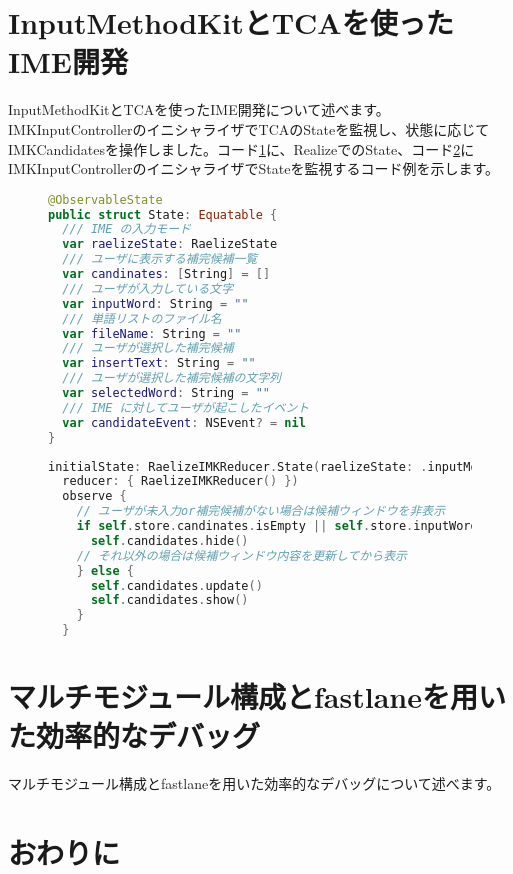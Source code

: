 \documentclass[uplatex,a4j,12pt,twocolumn]{jsarticle}
\begin{document}
\section{InputMethodKitとTCAを使ったIME開発}\label{sec:use_imk_and_tca}
InputMethodKitとTCAを使ったIME開発について述べます。IMKInputControllerのイニシャライザでTCAのStateを監視し、状態に応じてIMKCandidatesを操作しました。コード\ref{listings:state}に、RealizeでのState、コード\ref{listings:initial_state}にIMKInputControllerのイニシャライザでStateを監視するコード例を示します。

\begin{figure}[H]\label{listings:state}
\centering %
\begin{lstlisting}[caption=RealizeでのState例,language=swift]
@ObservableState
public struct State: Equatable {
  /// IME の入力モード
  var raelizeState: RaelizeState
  /// ユーザに表示する補完候補一覧
  var candinates: [String] = []
  /// ユーザが入力している文字
  var inputWord: String = ""
  /// 単語リストのファイル名
  var fileName: String = ""
  /// ユーザが選択した補完候補
  var insertText: String = ""
  /// ユーザが選択した補完候補の文字列
  var selectedWord: String = ""
  /// IME に対してユーザが起こしたイベント
  var candidateEvent: NSEvent? = nil
}
\end{lstlisting}
\end{figure}

\begin{figure}[h]\label{listings:initial_state}
\centering
\begin{lstlisting}[caption=IMKInputControllerのイニシャライザでのStateを監視する例,language=swift]
initialState: RaelizeIMKReducer.State(raelizeState: .inputMode),
  reducer: { RaelizeIMKReducer() })
  observe {
    // ユーザが未入力or補完候補がない場合は候補ウィンドウを非表示
    if self.store.candinates.isEmpty || self.store.inputWord.isEmpty {
      self.candidates.hide()
    // それ以外の場合は候補ウィンドウ内容を更新してから表示
    } else {
      self.candidates.update()
      self.candidates.show()
    }
  }
\end{lstlisting}
\end{figure}
\vspace{-1mm}


\section{マルチモジュール構成とfastlaneを用いた効率的なデバッグ}\label{sec:multi_module_and_fastlane}
マルチモジュール構成とfastlaneを用いた効率的なデバッグについて述べます。

\section{おわりに}\label{sec:conclusion}

 
 
\end{document}
